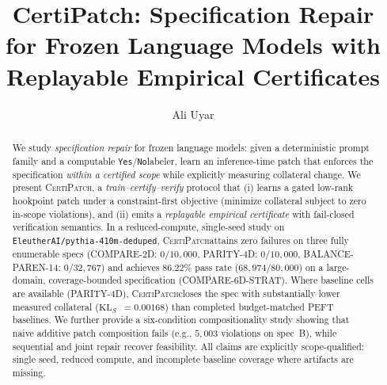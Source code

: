 \documentclass{article}
\title{CertiPatch: Specification Repair for Frozen Language Models with Replayable Empirical Certificates}
\author{Ali Uyar}
\newcommand{\Method}{\textsc{CertiPatch}}
\newcommand{\KLS}{\ensuremath{\mathrm{KL}_{S}}}
\newcommand{\Yes}{\texttt{Yes}}
\newcommand{\No}{\texttt{No}}
\begin{document}
\maketitle

\begin{abstract}
We study \emph{specification repair} for frozen language models: given a deterministic prompt family and a computable \Yes/\No labeler, learn an inference-time patch that enforces the specification \emph{within a certified scope} while explicitly measuring collateral change.
We present \Method, a \emph{train--certify--verify} protocol that (i) learns a gated low-rank hookpoint patch under a constraint-first objective (minimize collateral subject to zero in-scope violations), and (ii) emits a \emph{replayable empirical certificate} with fail-closed verification semantics.
In a reduced-compute, single-seed study on \texttt{EleutherAI/pythia-410m-deduped}, \Method attains zero failures on three fully enumerable specs (COMPARE-2D: $0/10{,}000$, PARITY-4D: $0/10{,}000$, BALANCE-PAREN-14: $0/32{,}767$) and achieves $86.22\%$ pass rate ($68{,}974/80{,}000$) on a large-domain, coverage-bounded specification (COMPARE-6D-STRAT).
Where baseline cells are available (PARITY-4D), \Method closes the spec with substantially lower measured collateral (\KLS\ $=0.00168$) than completed budget-matched PEFT baselines.
We further provide a six-condition compositionality study showing that naive additive patch composition fails (e.g., $5{,}003$ violations on spec~B), while sequential and joint repair recover feasibility.
All claims are explicitly scope-qualified: single seed, reduced compute, and incomplete baseline coverage where artifacts are missing.
\end{abstract}










\printbibliography

\appendix


\end{document}
